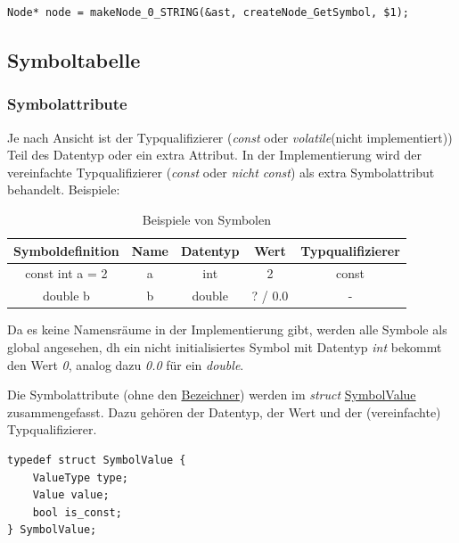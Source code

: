 \documentclass[oneside]{ausarbeitung}
\begin{document}
\begin{lstlisting}[label={lst:makeNode_use}, caption={Verknüpfung von "`makeNode"'- und "`createNode"'-Funktionen mit Parametern}]
Node* node = makeNode_0_STRING(&ast, createNode_GetSymbol, $1); 
\end{lstlisting}

\subsection{Symboltabelle}
\label{sub:impl_symtab}
\subsubsection{Symbolattribute}
\label{subsub:impl_symbols}
Je nach Ansicht ist der Typqualifizierer (\textit{const} oder \textit{volatile}(nicht implementiert)) Teil des Datentyp oder ein extra Attribut. In der Implementierung wird der vereinfachte Typqualifizierer (\textit{const} oder \textit{nicht const}) als extra Symbolattribut behandelt.
Beispiele:

\begin{table}
\begin{center}
\begin{tabular}{|c || c | c | c | c |} 
 \hline
 \textbf{Symboldefinition} & \textbf{Name} & \textbf{Datentyp} & \textbf{Wert} & \textbf{Typqualifizierer} \\
 \hline
 const int a = 2 & a & int & 2 & const \\ 
 \hline
 double b & b & double & ? / 0.0 & - \\
 \hline
\end{tabular}
\end{center}
\caption{Beispiele von Symbolen}
\label{tab:symbols}
\end{table}
Da es keine Namensräume in der Implementierung gibt, werden alle Symbole als global angesehen, \ac{dh} ein nicht initialisiertes Symbol mit Datentyp \textit{int} bekommt den Wert \textit{0}, analog dazu \textit{0.0} für ein \textit{double}.

Die Symbolattribute (ohne den \hyperref[sub:identifier]{Bezeichner}) werden im \textit{struct} \hyperref[lst:SymbolValue]{SymbolValue} zusammengefasst. Dazu gehören der Datentyp, der Wert und der (vereinfachte) Typqualifizierer.
\begin{lstlisting}[label={lst:SymbolValue}, caption={SymbolValue}]
typedef struct SymbolValue {
    ValueType type;
    Value value;
    bool is_const;
} SymbolValue;
\end{lstlisting}
\end{document}
